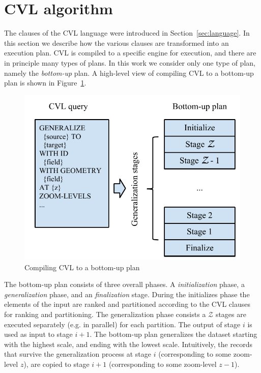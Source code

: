 \section{CVL algorithm}

The clauses of the CVL language were introduced in Section~\ref{sec:language}. In this section we describe how the various clauses are transformed into an execution plan. CVL is compiled to a specific engine for execution, and there are in principle many types of plans. In this work we consider only one type of plan, namely the \emph{bottom-up} plan. A high-level view of compiling CVL to a bottom-up plan is shown in Figure~\ref{fig:compilation}.

\begin{figure}[htbp]
\begin{center}
\includegraphics[scale=.75]{figs/cvl_compilation.pdf}
\caption{Compiling CVL to a bottom-up plan}
\label{fig:compilation}
\end{center}
\end{figure}

The bottom-up plan consists of three overall phases. A \emph{initialization} phase, a \emph{generalization} phase, and an \emph{finalization} stage. During the initializes phase the elements of the input are ranked and partitioned according to the CVL clauses for ranking and partitioning. The generalization phase consists a $\mathcal{Z}$ stages are executed separately (e.g. in parallel) for each partition. The output of stage $i$ is used as input to stage $i+1$. The bottom-up plan generalizes the dataset starting with the highest scale, and ending with the lowest scale. Intuitively, the records that survive the generalization process at stage $i$ (corresponding to some zoom-level $z$), are copied to stage $i+1$ (corresponding to some zoom-level $z-1$).


